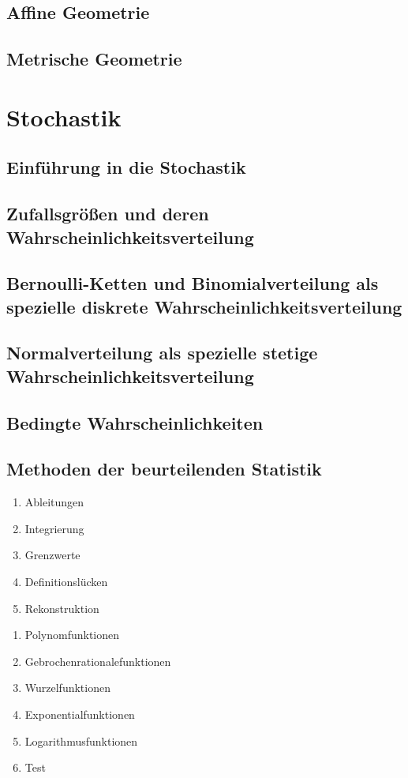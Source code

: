 \documentclass{article}
\begin{document}
\subsection{Affine Geometrie}
\subsection{Metrische Geometrie}

\section{Stochastik}
\subsection{Einführung in die Stochastik}
\subsection{Zufallsgrößen und deren Wahrscheinlichkeitsverteilung}
\subsection{Bernoulli-Ketten und Binomialverteilung als spezielle diskrete Wahrscheinlichkeitsverteilung}
\subsection{Normalverteilung als spezielle stetige Wahrscheinlichkeitsverteilung}
\subsection{Bedingte Wahrscheinlichkeiten}
\subsection{Methoden der beurteilenden Statistik}


\begin{enumerate}
    \item Ableitungen
    \item Integrierung
    \item Grenzwerte
    \item Definitionslücken
    \item Rekonstruktion
\end{enumerate}
\begin{enumerate}
    \item Polynomfunktionen
    \item Gebrochenrationalefunktionen
    \item Wurzelfunktionen
    \item Exponentialfunktionen
    \item Logarithmusfunktionen
    \item Test
\end{enumerate}
\end{document}
